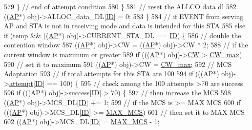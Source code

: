 \begin{DoxyCode}
{{579             \} \textcolor{comment}{// end of attempt condition}
580         \}
581         \textcolor{comment}{// reset the ALLCO data dl}
582         ((\hyperlink{classAP}{AP}*) obj)->ALLOC\_data\_DL[\hyperlink{classSTA_a9376abb50969b5b16aeb5fb0e449e6f7}{ID}] = 0;
583     \}
584     \textcolor{comment}{// if EVENT from serving AP and STA is not in receiving mode and data is intended for this STA}
585     \textcolor{keywordflow}{else} \textcolor{keywordflow}{if} (temp && ((\hyperlink{classAP}{AP}*) obj)->CURRENT\_STA\_DL == \hyperlink{classSTA_a9376abb50969b5b16aeb5fb0e449e6f7}{ID}) \{
586         \textcolor{comment}{// double the contention window}
587         ((\hyperlink{classAP}{AP}*) obj)->CW = ((\hyperlink{classAP}{AP}*) obj)->CW * 2;
588         \textcolor{comment}{// if the current window is maximum or greater}
589         \textcolor{keywordflow}{if} (((\hyperlink{classAP}{AP}*) obj)->\hyperlink{classSTA_add0683c8927abd74b422d88844a00602}{CW} > \hyperlink{classSTA_ac341bce4f378ac00fd29b69a44b75dee}{CW\_max})
590             \textcolor{comment}{// set it to maximum}
591             ((\hyperlink{classAP}{AP}*) obj)->CW = \hyperlink{classSTA_ac341bce4f378ac00fd29b69a44b75dee}{CW\_max};
592         \textcolor{comment}{// MCS Adaptation}
593         \textcolor{comment}{// if total attempts for this STA are 100   }
594         \textcolor{keywordflow}{if} (((\hyperlink{classAP}{AP}*) obj)->\hyperlink{classSTA_a4cfeac60ce7a13a4bbae68b756655dc9}{attempt}[\hyperlink{classSTA_a9376abb50969b5b16aeb5fb0e449e6f7}{ID}] == 100) \{
595             \textcolor{comment}{// check among the 100 attempts >70 are success}
596             \textcolor{keywordflow}{if} (((\hyperlink{classAP}{AP}*) obj)->\hyperlink{classSTA_a8f2d6be8326b3e46fbf1599040bff750}{success}[\hyperlink{classSTA_a9376abb50969b5b16aeb5fb0e449e6f7}{ID}] > 70) \{
597                 \textcolor{comment}{// then increase the MCS}
598                 ((\hyperlink{classAP}{AP}*) obj)->MCS\_DL[\hyperlink{classSTA_a9376abb50969b5b16aeb5fb0e449e6f7}{ID}] += 1;
599                 \textcolor{comment}{// if the MCS is >= MAX MCS}
600                 \textcolor{keywordflow}{if} (((\hyperlink{classAP}{AP}*) obj)->MCS\_DL[\hyperlink{classSTA_a9376abb50969b5b16aeb5fb0e449e6f7}{ID}] >= \hyperlink{classSTA_a5c5df3db89aa13fc409c4c0d6f8924d2}{MAX\_MCS})
601                     \textcolor{comment}{// then set it to MAX MCS}
602                     ((\hyperlink{classAP}{AP}*) obj)->MCS\_DL[\hyperlink{classSTA_a9376abb50969b5b16aeb5fb0e449e6f7}{ID}] = \hyperlink{classSTA_a5c5df3db89aa13fc409c4c0d6f8924d2}{MAX\_MCS} - 1;
}}
\end{DoxyCode}

